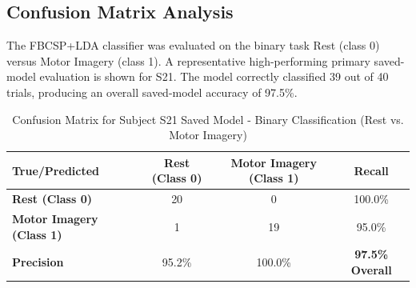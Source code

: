 \begin{table}[H]
    \centering
    \caption{Proxy Best-Available Evaluation for Models Without Matching Subject Data}
    \label{tab:proxy_accuracy}
\end{table}

\subsection{Confusion Matrix Analysis}

The FBCSP+LDA classifier was evaluated on the binary task Rest (class 0) versus Motor Imagery (class 1). A representative high-performing primary saved-model evaluation is shown for S21. The model correctly classified 39 out of 40 trials, producing an overall saved-model accuracy of 97.5\%.

\begin{table}[H]
    \centering
    \caption{Confusion Matrix for Subject S21 Saved Model - Binary Classification (Rest vs. Motor Imagery)}
    \label{tab:confusion_s21}
    \begin{tabular}{|l|c|c|c|}
        \hline
        \textbf{True/Predicted} & \textbf{Rest (Class 0)} & \textbf{Motor Imagery (Class 1)} & \textbf{Recall} \\ \hline
        \textbf{Rest (Class 0)} & 20 & 0 & 100.0\% \\ \hline
        \textbf{Motor Imagery (Class 1)} & 1 & 19 & 95.0\% \\ \hline
        \textbf{Precision} & 95.2\% & 100.0\% & \textbf{97.5\% Overall} \\ \hline
    \end{tabular}
\end{table}


